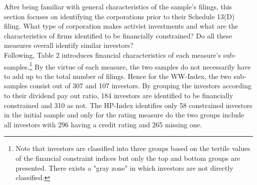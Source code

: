 \documentclass[12pt]{article}
\begin{document}
After being familiar with general characteristics of the sample's filings, this section focuses on identifying the corporations prior to their Schedule 13(D) filing. What type of corporation makes activist investments and what are the characteristics of firms identified to be financially constrained? Do all these measures overall identify similar investors?\\
Following, Table 2 introduces financial characteristics of each measure's sub-samples.\footnote{Note that investors are classified into three groups based on the tertile values of the financial constraint indices but only the top and bottom groups are presented. There exists a "gray zone" in which investors are not directly classified.} By the virtue of each measure, the two samples do not necessarily have to add up to the total number of filings. Hence for the WW-Index, the two sub-samples consist out of 307 and 107 investors. By grouping the investors according to their dividend pay out ratio, 184 investors are identified to be financially constrained and 310 as not. The HP-Index identifies only 58 constrained investors in the initial sample and only for the rating measure do the two groups include all investors with 296 having a credit rating and 265 missing one.\\
\end{document}
